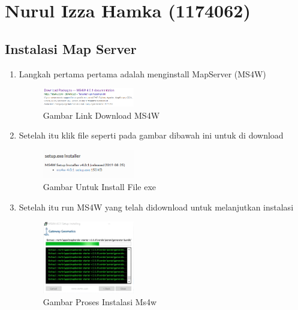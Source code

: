 \section{Nurul Izza Hamka (1174062)}
\subsection{Instalasi Map Server}
\begin{enumerate}
    \item Langkah pertama pertama  adalah menginstall MapServer (MS4W)
  \hfill\break
  \begin{figure}[H]
  \includegraphics[width=4cm]{figures/tugas4/1174062/1.png}
  \centering
  \caption{Gambar Link Download MS4W}
  \end{figure}
    
    \item Setelah itu klik file seperti pada gambar dibawah ini untuk di download
    
  \hfill\break
  \begin{figure}[H]
  \includegraphics[width=4cm]{figures/tugas4/1174062/2.png}
  \centering
  \caption{Gambar Untuk Install File exe}
  \end{figure}
  
    \item Setelah itu run MS4W yang telah didownload untuk melanjutkan instalasi
    
  \hfill\break
  \begin{figure}[H]
  \includegraphics[width=4cm]{figures/tugas4/1174062/3.png}
  \centering
  \caption{Gambar Proses Instalasi Ms4w}
  \end{figure}
  
\end{enumerate}


